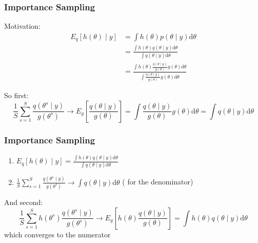 \documentclass{beamer}
\begin{document}
\begin{frame}[fragile]
\frametitle{Importance Sampling}

Motivation:
\begin{align*}
E_q[h(\theta) \mid y] &= \int h(\theta) p(\theta \mid y) \text{d}\theta \\
&= \frac{\int h(\theta) q(\theta \mid y) \text{d}\theta }{\int q(\theta \mid y) \text{d}\theta } \\
&= \frac{\int h(\theta) \frac{q(\theta \mid y)}{g(\theta)}g(\theta) \text{d}\theta }{\int \frac{q(\theta \mid y)}{g(\theta)}g(\theta) \text{d}\theta } 
\end{align*}
\newline
\pause

So first:
\[
\frac{1}{S}\sum_{s=1}^S \frac{q(\theta^s \mid y)}{g(\theta^s)} \to E_g\left[\frac{q(\theta \mid y)}{g(\theta)} \right] = \int \frac{q(\theta \mid y)}{g(\theta)} g(\theta) \text{d}\theta = \int q(\theta \mid y) \text{d}\theta
\]

\end{frame}

\begin{frame}[fragile]
\frametitle{Importance Sampling}

\begin{enumerate}
\item $E_q[h(\theta) \mid y] = \frac{\int h(\theta) q(\theta \mid y) \text{d}\theta }{\int q(\theta \mid y) \text{d}\theta } $
\item $\frac{1}{S}\sum_{s=1}^S \frac{q(\theta^s \mid y)}{g(\theta^s)} \to \int q(\theta \mid y) \text{d}\theta$ ( for the denominator)
\end{enumerate}
And second:
\[
\frac{1}{S}\sum_{s=1}^S h(\theta^s) \frac{q(\theta^s \mid y)}{g(\theta^s)} \to E_g\left[h(\theta)\frac{q(\theta \mid y)}{g(\theta)} \right] = \int h(\theta)q(\theta \mid y) \text{d}\theta
\]
which converges to the numerator

\end{frame}
\end{document}

